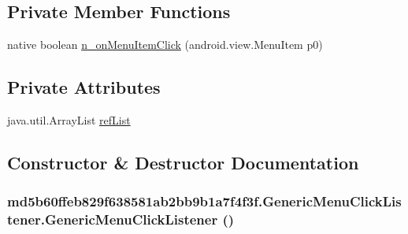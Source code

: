 \subsection*{Private Member Functions}
\begin{CompactItemize}
\item 
native boolean \hyperlink{classmd5b60ffeb829f638581ab2bb9b1a7f4f3f_1_1_generic_menu_click_listener_d79cc5f2c942327d4e5cf787a3c966ba}{n\_\-onMenuItemClick} (android.view.MenuItem p0)
\end{CompactItemize}
\subsection*{Private Attributes}
\begin{CompactItemize}
\item 
java.util.ArrayList \hyperlink{classmd5b60ffeb829f638581ab2bb9b1a7f4f3f_1_1_generic_menu_click_listener_909ed47c921c4011184b52ac08dcc46e}{refList}
\end{CompactItemize}


\subsection{Constructor \& Destructor Documentation}
\hypertarget{classmd5b60ffeb829f638581ab2bb9b1a7f4f3f_1_1_generic_menu_click_listener_d3240942327ae015893fa8e27045fe57}{
\subsubsection[{GenericMenuClickListener}]{\setlength{\rightskip}{0pt plus 5cm}md5b60ffeb829f638581ab2bb9b1a7f4f3f.GenericMenuClickListener.GenericMenuClickListener ()}}
\label{classmd5b60ffeb829f638581ab2bb9b1a7f4f3f_1_1_generic_menu_click_listener_d3240942327ae015893fa8e27045fe57}




